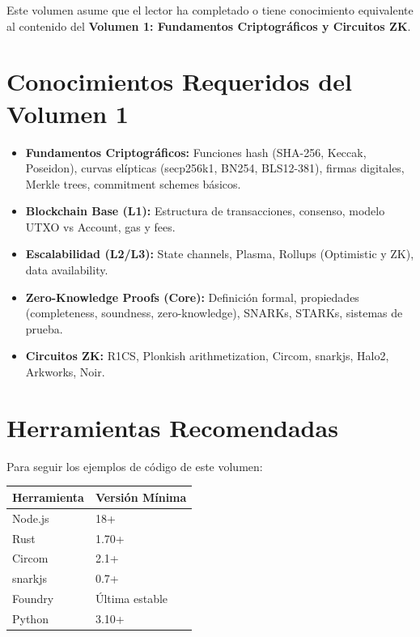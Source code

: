 \documentclass[11pt,a4paper,twoside]{book}
\begin{document}
Este volumen asume que el lector ha completado o tiene conocimiento equivalente al contenido del \textbf{Volumen 1: Fundamentos Criptogr\'aficos y Circuitos ZK}.

\section*{Conocimientos Requeridos del Volumen 1}

\begin{itemize}[leftmargin=2cm]
    \item[\textbf{Cap. 1}] \textbf{Fundamentos Criptogr\'aficos:} Funciones hash (SHA-256, Keccak, Poseidon), curvas el\'ipticas (secp256k1, BN254, BLS12-381), firmas digitales, Merkle trees, commitment schemes b\'asicos.
    
    \item[\textbf{Cap. 2}] \textbf{Blockchain Base (L1):} Estructura de transacciones, consenso, modelo UTXO vs Account, gas y fees.
    
    \item[\textbf{Cap. 3}] \textbf{Escalabilidad (L2/L3):} State channels, Plasma, Rollups (Optimistic y ZK), data availability.
    
    \item[\textbf{Cap. 4}] \textbf{Zero-Knowledge Proofs (Core):} Definici\'on formal, propiedades (completeness, soundness, zero-knowledge), SNARKs, STARKs, sistemas de prueba.
    
    \item[\textbf{Cap. 5}] \textbf{Circuitos ZK:} R1CS, Plonkish arithmetization, Circom, snarkjs, Halo2, Arkworks, Noir.
\end{itemize}

\section*{Herramientas Recomendadas}

Para seguir los ejemplos de c\'odigo de este volumen:

\begin{center}
\begin{tabular}{ll}
\toprule
\textbf{Herramienta} & \textbf{Versi\'on M\'inima} \\
\midrule
Node.js & 18+ \\
Rust & 1.70+ \\
Circom & 2.1+ \\
snarkjs & 0.7+ \\
Foundry & \'Ultima estable \\
Python & 3.10+ \\
\bottomrule
\end{tabular}
\end{center}
\end{document}
